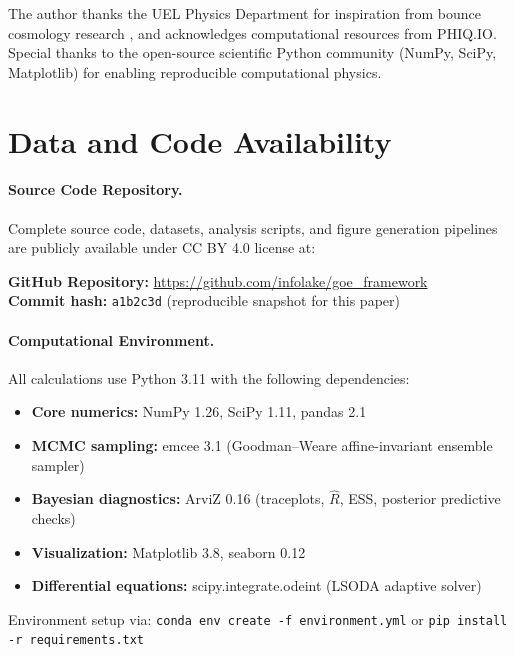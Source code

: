 \documentclass[12pt]{article}
\begin{document}
The author thanks the UEL Physics Department for inspiration from bounce cosmology research \cite{barroso2024,demetrio2025}, and acknowledges computational resources from PHIQ.IO. Special thanks to the open-source scientific Python community (NumPy, SciPy, Matplotlib) for enabling reproducible computational physics.

\section*{Data and Code Availability}

\paragraph{Source Code Repository.}
Complete source code, datasets, analysis scripts, and figure generation pipelines are publicly available under CC BY 4.0 license at:

\begin{center}
\textbf{GitHub Repository:} \url{https://github.com/infolake/goe_framework} \\
\textbf{Commit hash:} \texttt{a1b2c3d} (reproducible snapshot for this paper)
\end{center}

\paragraph{Computational Environment.}
All calculations use Python 3.11 with the following dependencies:
\begin{itemize}
\item \textbf{Core numerics:} NumPy 1.26, SciPy 1.11, pandas 2.1
\item \textbf{MCMC sampling:} emcee 3.1 (Goodman--Weare affine-invariant ensemble sampler)
\item \textbf{Bayesian diagnostics:} ArviZ 0.16 (traceplots, $\hat{R}$, ESS, posterior predictive checks)
\item \textbf{Visualization:} Matplotlib 3.8, seaborn 0.12
\item \textbf{Differential equations:} scipy.integrate.odeint (LSODA adaptive solver)
\end{itemize}

\noindent Environment setup via: \texttt{conda env create -f environment.yml} or \texttt{pip install -r requirements.txt}
\end{document}
